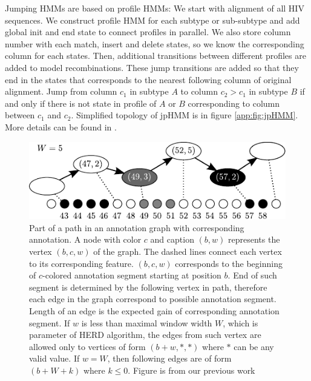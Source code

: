 Jumping HMMs are based on profile HMMs: We start with alignment of all HIV
sequences. We construct profile HMM for each subtype or sub-subtype and add
global init and end state to connect profiles in parallel. We also store column
number with each match, insert and delete states, so we know the corresponding
column for each states. Then, additional transitions between different profiles
are added to model recombinations. These jump transitions are added so that they
end in the states that corresponds to the nearest following column of original
alignment. Jump from column $c_1$ in subtype $A$ to column $c_2>c_1$ in subtype
$B$ if and only if there is not state in profile of $A$ or $B$ corresponding to
column between $c_1$ and $c_2$.  Simplified topology of jpHMM is in figure
\ref{app:fig:jpHMM}. More details can be found in \cite{Schultz2006,
Nanasi2010mgr, Nanasi2010}.

\begin{figure}
\begin{center}
\includegraphics{../figures/herd_graph}
\end{center} 
\caption[Annotation graph]{Part of a path in an annotation graph with
corresponding annotation. A node with color $c$ and caption $(b,w)$ represents
the vertex $(b,c,w)$ of the graph. The dashed lines connect each vertex to its
corresponding feature. $(b, c, w)$ corresponds to the beginning of $c$-colored
annotation segment starting at position $b$. End of such segment is determined
by the following vertex in path, therefore each edge in the graph correspond to
possible annotation segment. Length of an edge is the expected gain of
corresponding annotation segment. If $w$ is less than maximal window width $W$,
which is parameter of HERD algorithm, the edges from such vertex are allowed
only to vertices of form $(b+w, *, *)$ where $*$ can be any valid value. If
$w=W$, then following edges are of form $(b+W+k)$ where $k\leq0$.  Figure is
from our previous work \cite{}}\label{HERD:figure:annotation_graph} 
\end{figure}


